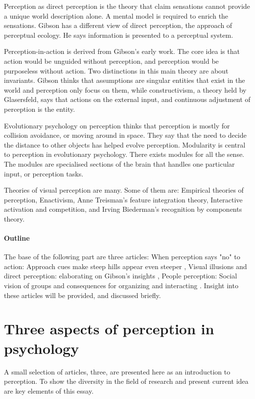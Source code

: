 \documentclass[12pt, a4paper]{article}
\begin{document}
Perception as direct perception is the theory that claim sensations cannot
provide a unique world description alone. A mental model is required to enrich
the sensations. Gibson has a different view of direct perception, the approach of
perceptual ecology. He says information is presented to a perceptual system.
\cite{wiki}


Perception-in-action is derived from Gibson's early work. The core idea is that
action would be unguided without perception, and perception would be
purposeless without action. Two distinctions in this main theory are
about invariants. Gibson thinks that assumptions are singular entities that exist in the world and
perception only focus on them, while constructivism, a theory held by
Glasersfeld\cite{wiki}, says that actions on the external input, and
continuous adjustment of perception is the entity.  

Evolutionary psychology on perception thinks that perception is mostly for
collision avoidance, or moving around in space. They say that the need to
decide the distance to other objects has helped evolve perception. 
Modularity is central to perception in evolutionary psychology. There exists modules for all
the sense. The modules are specialised sections of the brain that handles one
particular input, or perception tasks. 

Theories of visual perception are many. Some of them are:  Empirical theories of
perception, Enactivism, Anne Treisman's feature integration theory, Interactive
activation and competition, and Irving Biederman's recognition by components
theory. \cite{wiki} 

\paragraph{Outline}

The base of the following part are three articles: When perception says "no" to action: Approach cues make
steep hills appear even steeper \cite{noaction}, Visual illusions and direct perception:
elaborating on Gibson's insights \cite{visualillusion}, People
perception: Social vision of groups and consequences for organizing and
interacting
\cite{peopleperception}. Insight into these articles will be provided, and
discussed briefly.

\section{Three aspects of perception in psychology}\label{discussion}
A small selection of articles, three, are presented here as an introduction to
perception. To show the diversity in the field of research and present current
idea are key elements of this essay. 
\end{document}
